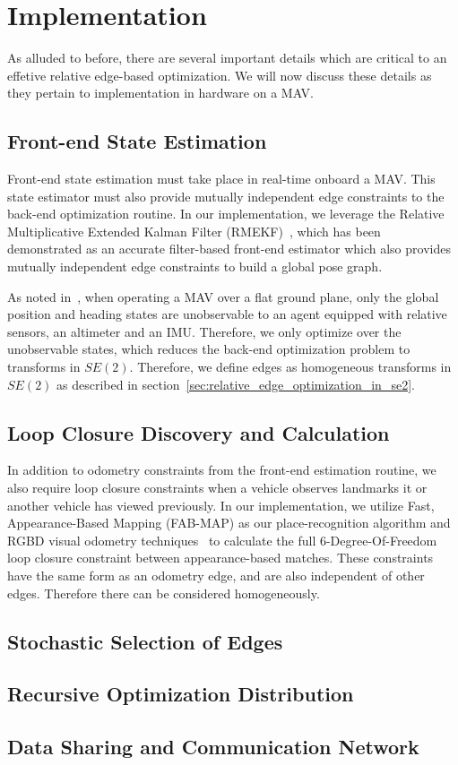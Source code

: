 
\section{Implementation}
As alluded to before, there are several important details which are critical to an effetive relative edge-based optimization.  We will now discuss these details as they pertain to implementation in hardware on a MAV.

\subsection{Front-end State Estimation}Front-end state estimation must take place in real-time onboard a MAV. This state estimator must also provide mutually independent edge constraints to the back-end optimization routine.  In our implementation, we leverage the Relative Multiplicative Extended Kalman Filter (RMEKF)~\cite{Koch2017}, which has been demonstrated as an accurate filter-based front-end estimator which also provides mutually independent edge constraints to build a global pose graph.

As noted in~\cite{Wheeler2017a}, when operating a MAV over a flat ground plane, only the global position and heading states are unobservable to an agent equipped with relative sensors, an altimeter and an IMU.  Therefore, we only optimize over the unobservable states, which reduces the back-end optimization problem to transforms in $SE(2)$.  Therefore, we define edges as homogeneous transforms in $SE(2)$ as described in section~\ref{sec:relative_edge_optimization_in_se2}.

\subsection{Loop Closure Discovery and Calculation}
In addition to odometry constraints from the front-end estimation routine, we also require loop closure constraints when a vehicle observes landmarks it or another vehicle has viewed previously.  In our implementation, we utilize Fast, Appearance-Based Mapping (FAB-MAP) as our place-recognition algorithm and RGBD visual odometry techniques~\cite{Leishman2013} to calculate the full 6-Degree-Of-Freedom loop closure constraint between appearance-based matches.  These constraints have the same form as an odometry edge, and are also independent of other edges.  Therefore there can be considered homogeneously.

\subsection{Stochastic Selection of Edges}

\subsection{Recursive Optimization Distribution}

\subsection{Data Sharing and Communication Network}
